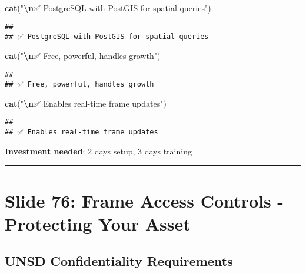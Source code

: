 \documentclass[
]{article}
\newenvironment{Shaded}{\begin{snugshade}}{\end{snugshade}}
\newcommand{\FunctionTok}[1]{\textcolor[rgb]{0.13,0.29,0.53}{\textbf{#1}}}
\newcommand{\NormalTok}[1]{#1}
\newcommand{\SpecialCharTok}[1]{\textcolor[rgb]{0.81,0.36,0.00}{\textbf{#1}}}
\newcommand{\StringTok}[1]{\textcolor[rgb]{0.31,0.60,0.02}{#1}}
\begin{document}
\begin{Shaded}
\begin{Highlighting}[]
\FunctionTok{cat}\NormalTok{(}\StringTok{"}\SpecialCharTok{\textbackslash{}n}\StringTok{✅ PostgreSQL with PostGIS for spatial queries"}\NormalTok{)}
\end{Highlighting}
\end{Shaded}

\begin{verbatim}
## 
## ✅ PostgreSQL with PostGIS for spatial queries
\end{verbatim}

\begin{Shaded}
\begin{Highlighting}[]
\FunctionTok{cat}\NormalTok{(}\StringTok{"}\SpecialCharTok{\textbackslash{}n}\StringTok{✅ Free, powerful, handles growth"}\NormalTok{)}
\end{Highlighting}
\end{Shaded}

\begin{verbatim}
## 
## ✅ Free, powerful, handles growth
\end{verbatim}

\begin{Shaded}
\begin{Highlighting}[]
\FunctionTok{cat}\NormalTok{(}\StringTok{"}\SpecialCharTok{\textbackslash{}n}\StringTok{✅ Enables real{-}time frame updates"}\NormalTok{)}
\end{Highlighting}
\end{Shaded}

\begin{verbatim}
## 
## ✅ Enables real-time frame updates
\end{verbatim}

\textbf{Investment needed}: 2 days setup, 3 days training

\begin{center}\rule{0.5\linewidth}{0.5pt}\end{center}

\section{Slide 76: Frame Access Controls - Protecting Your
Asset}\label{slide-76-frame-access-controls---protecting-your-asset}

\subsection{UNSD Confidentiality
Requirements}\label{unsd-confidentiality-requirements}
\end{document}
